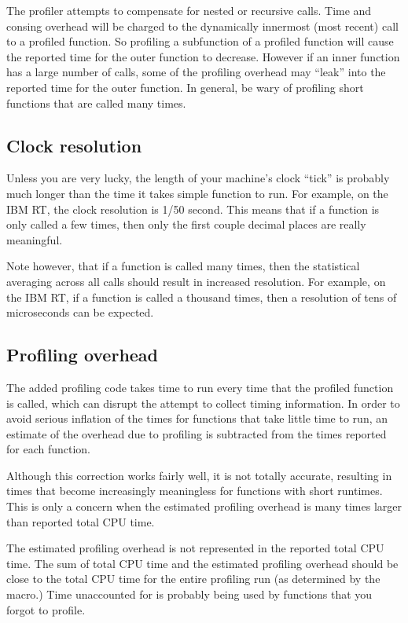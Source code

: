 The profiler attempts to compensate for nested or recursive calls.  Time and
consing overhead will be charged to the dynamically innermost (most recent)
call to a profiled function.  So profiling a subfunction of a profiled function
will cause the reported time for the outer function to decrease.  However if an
inner function has a large number of calls, some of the profiling overhead may
``leak'' into the reported time for the outer function.  In general, be wary of
profiling short functions that are called many times.


\subsection{Clock resolution}

Unless you are very lucky, the length of your machine's clock ``tick'' is
probably much longer than the time it takes simple function to run.  For
example, on the IBM RT, the clock resolution is 1/50 second.  This means that
if a function is only called a few times, then only the first couple decimal
places are really meaningful.  

Note however, that if a function is called many times, then the statistical
averaging across all calls should result in increased resolution.  For example,
on the IBM RT, if a function is called a thousand times, then a resolution of
tens of microseconds can be expected.

\subsection{Profiling overhead}

The added profiling code takes time to run every time that the profiled
function is called, which can disrupt the attempt to collect timing
information.  In order to avoid serious inflation of the times for functions
that take little time to run, an estimate of the overhead due to profiling is
subtracted from the times reported for each function.

Although this correction works fairly well, it is not totally accurate,
resulting in times that become increasingly meaningless for functions with
short runtimes.  This is only a concern when the estimated profiling overhead
is many times larger than reported total CPU time.

The estimated profiling overhead is not represented in the reported total CPU
time.  The sum of total CPU time and the estimated profiling overhead should be
close to the total CPU time for the entire profiling run (as determined by the
 macro.)  Time unaccounted for is probably being used by functions that
you forgot to profile.

